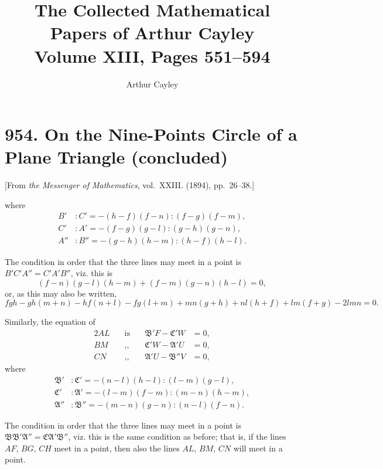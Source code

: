 \documentclass[12pt,a4paper]{article}
\title{\textbf{The Collected Mathematical Papers of Arthur Cayley}\\[6pt]
\Large Volume XIII, Pages 551--594}
\author{Arthur Cayley}
\date{}
\theoremstyle{definition}
\begin{document}
\maketitle
\thispagestyle{fancy}

\tableofcontents
\newpage

\section{954. On the Nine-Points Circle of a Plane Triangle (concluded)}
\label{sec:954}

[From \textit{the Messenger of Mathematics}, vol.~XXIII. (1894), pp.~26--38.]
\bigskip

\noindent
where
\begin{align*}
B' &: C' = -(h-f)(f-n) : (f-g)(f-m),\\
C' &: A' = -(f-g)(g-l) : (g-h)(g-n),\\
A'' &: B'' = -(g-h)(h-m) : (h-f)(h-l).
\end{align*}

The condition in order that the three lines may meet in a point is
$B'C'A'' = C'A'B''$, viz. this is
\[
(f-n)(g-l)(h-m) + (f-m)(g-n)(h-l) = 0,
\]
or, as this may also be written,
\[
fgh - gh(m+n) - hf(n+l) - fg(l+m) + mn(g+h) + nl(h+f) + lm(f+g) - 2lmn = 0.
\]

Similarly, the equation of
\begin{alignat*}{2}
AL &\quad \text{is} \quad & \mathfrak{B}'F - \mathfrak{C}'W &= 0,\\
BM &\quad \text{,,} \quad & \mathfrak{C}'W - \mathfrak{A}'U &= 0,\\
CN &\quad \text{,,} \quad & \mathfrak{A}'U - \mathfrak{B}''V &= 0,
\end{alignat*}
where
\begin{align*}
\mathfrak{B}' &: \mathfrak{C}' = -(n-l)(h-l) : (l-m)(g-l),\\
\mathfrak{C}' &: \mathfrak{A}' = -(l-m)(f-m) : (m-n)(h-m),\\
\mathfrak{A}'' &: \mathfrak{B}'' = -(m-n)(g-n) : (n-l)(f-n).
\end{align*}

The condition in order that the three lines may meet in a point is
$\mathfrak{B}\mathfrak{B}'\mathfrak{A}'' = \mathfrak{C}\mathfrak{A}'\mathfrak{B}''$, viz. this is the same condition as before; that is, if the lines $AF$, $BG$, $CH$ meet in a point, then also the lines $AL$, $BM$, $CN$ will meet in a point.
\end{document}
